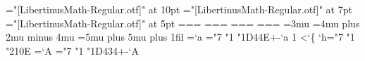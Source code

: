 
\def\space{ }
\def\loop#1\repeat{\def\body{#1}\iterate}\let\repeat=\fi
\def\iterate{\body \let\next\iterate \else\let\next\relax\fi \next}
\font\mt="[LibertinusMath-Regular.otf]" at 10pt \font\ms="[LibertinusMath-Regular.otf]" at 7pt \font\mss="[LibertinusMath-Regular.otf]" at 5pt
=\mt {}=\ms {}=\mss
{}=\mt {}=\ms {}=\mss
{}=\mt {}=\ms {}=\mss
{}=\mt {}=\ms {}=\mss
{} \delimitershortfall=5pt \nulldelimiterspace=1.2pt \scriptspace=0.5pt
\thinmuskip=3mu \medmuskip=4mu plus 2mu minus 4mu \thickmuskip=5mu plus 5mu
\hsize=300pt \parindent=0pt \parfillskip=0pt plus 1fil \baselineskip=12pt
=`a \loop \Umathcode{}="7 "1 \numexpr"1D44E+-`a\relax
  \advance{} 1 \ifnum{}<`\{\repeat
\Umathcode`h="7 "1 "210E
=`A \loop \Umathcode{}="7 "1 \numexpr"1D434+-`A\relax
